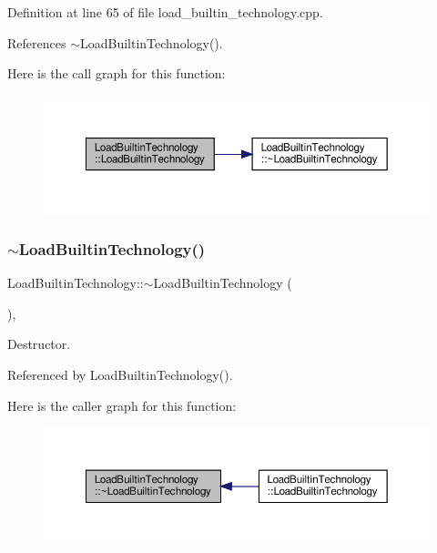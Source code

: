 Definition at line 65 of file load\+\_\+builtin\+\_\+technology.\+cpp.



References $\sim$\+Load\+Builtin\+Technology().

Here is the call graph for this function\+:
\nopagebreak
\begin{figure}[H]
\begin{center}
\leavevmode
\includegraphics[width=350pt]{d2/dd4/classLoadBuiltinTechnology_a72003dba9c64ce68c9f5c19c6353e39d_cgraph}
\end{center}
\end{figure}
\mbox{\label{classLoadBuiltinTechnology_a3eedd407b5c1f59fc4b1ca9e5a5fca19}} 
\subsubsection{\texorpdfstring{$\sim$\+Load\+Builtin\+Technology()}{~LoadBuiltinTechnology()}}
{\footnotesize\ttfamily Load\+Builtin\+Technology\+::$\sim$\+Load\+Builtin\+Technology (\begin{DoxyParamCaption}{ }\end{DoxyParamCaption})\hspace{0.3cm}{\ttfamily [override]}, {\ttfamily [default]}}



Destructor. 



Referenced by Load\+Builtin\+Technology().

Here is the caller graph for this function\+:
\nopagebreak
\begin{figure}[H]
\begin{center}
\leavevmode
\includegraphics[width=350pt]{d2/dd4/classLoadBuiltinTechnology_a3eedd407b5c1f59fc4b1ca9e5a5fca19_icgraph}
\end{center}
\end{figure}


